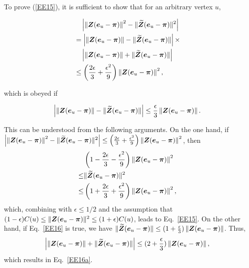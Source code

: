 \documentclass[journal]{IEEEtran}
\begin{document}
\begin{IEEEproof}
    To prove (\ref{EE15}), it is sufficient  to show that for an arbitrary vertex \(u\),
    \begin{small}
        \begin{align}\label{EE16a}
             & \quad \left|\left\Vert\boldsymbol{Z}(\boldsymbol{e}_u-\boldsymbol{\pi})\right\Vert^2-\|{\widetilde{\boldsymbol{Z}}(\boldsymbol{e}_u-\boldsymbol{\pi})}\|^2 \right|\nonumber \\
             & =
            \left|\left\Vert\boldsymbol{Z}(\boldsymbol{e}_u-\boldsymbol{\pi})\right\Vert-\|\widetilde{\boldsymbol{Z}}(\boldsymbol{e}_u-\boldsymbol{\pi})\| \right|\times \nonumber         \\
             & \quad\left|\left\Vert\boldsymbol{Z}(\boldsymbol{e}_u-\boldsymbol{\pi})\right\Vert+\|\widetilde{\boldsymbol{Z}}(\boldsymbol{e}_u-\boldsymbol{\pi})\| \right| \nonumber       \\
             & \le
            \left(\frac{2\epsilon}{3}+\frac{\epsilon^2}{9}\right)\left\Vert\boldsymbol{Z}(\boldsymbol{e}_u-\boldsymbol{\pi})\right\Vert^2,
        \end{align}
    \end{small}
    which is obeyed if
    \begin{small}
        \begin{equation}\label{EE16}
            \left|\left\Vert\boldsymbol{Z}(\boldsymbol{e}_u-\boldsymbol{\pi})\right\Vert-\|\widetilde{\boldsymbol{Z}}(\boldsymbol{e}_u-\boldsymbol{\pi})\| \right| \le
            \frac{\epsilon}{3}\left\Vert\boldsymbol{Z}(\boldsymbol{e}_u-\boldsymbol{\pi})\right\Vert.
        \end{equation}
    \end{small}
    This can be understood from the following arguments. On the one hand, if
    {\footnotesize \(\left|\left\Vert\boldsymbol{Z}(\boldsymbol{e}_u-\boldsymbol{\pi})\right\Vert^2-\|{\widetilde{\boldsymbol{Z}}(\boldsymbol{e}_u-\boldsymbol{\pi})}\|^2 \right| \le \left(\frac{2\epsilon}{3}+\frac{\epsilon^2}{9}\right)\left\Vert\boldsymbol{Z}(\boldsymbol{e}_u-\boldsymbol{\pi})\right\Vert^2\)}, then
    \begin{align*}
            & \left(1-\frac{2\epsilon}{3}-\frac{\epsilon^2}{9}\right)\left\Vert\boldsymbol{Z}(\boldsymbol{e}_u-\boldsymbol{\pi})\right\Vert^2  \\
        \le & \|{\widetilde{\boldsymbol{Z}}(\boldsymbol{e}_u-\boldsymbol{\pi})}\|^2                                                      \\
        \le & \left(1+\frac{2\epsilon}{3}+\frac{\epsilon^2}{9}\right)\left\Vert\boldsymbol{Z}(\boldsymbol{e}_u-\boldsymbol{\pi})\right\Vert^2,
    \end{align*}
    which, combining with \(\epsilon \le 1/2\) and the assumption that \((1-\epsilon) C(u)\leq\|\boldsymbol{Z} (\boldsymbol{e}_{u} - \boldsymbol{\pi})\|^{2}\leq(1+\epsilon)  C(u)\), leads to Eq.~\eqref{EE15}.
    On the other hand, if Eq.~\eqref{EE16} is true, we have \(\|\widetilde{\boldsymbol{Z}}(\boldsymbol{e}_u-\boldsymbol{\pi})\| \le (1+\frac{\epsilon}{3})\left\Vert\boldsymbol{Z}(\boldsymbol{e}_u-\boldsymbol{\pi})\right\Vert\). Thus,
    \begin{equation*}
        \left|\left\Vert\boldsymbol{Z}(\boldsymbol{e}_u-\boldsymbol{\pi})\right\Vert+\|\widetilde{\boldsymbol{Z}}(\boldsymbol{e}_u-\boldsymbol{\pi})\| \right| \le (2+\frac{\epsilon}{3})\left\Vert\boldsymbol{Z}(\boldsymbol{e}_u-\boldsymbol{\pi})\right\Vert,
    \end{equation*}
    which results in Eq.~\eqref{EE16a}.


\end{IEEEproof}
\end{document}
